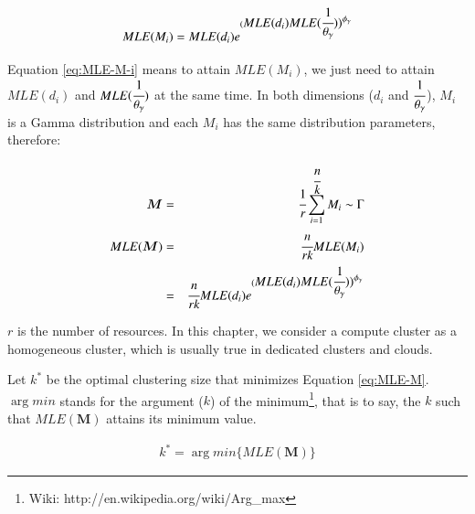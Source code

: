 \begin{equation} 
\label{eq:MLE-M-i}
MLE(M_i)=MLE(d_i)e^{(\displaystyle MLE(d_i)MLE(\cfrac{1}{\theta_{\gamma}}))^{\phi_{\gamma}}} 
\end{equation}

Equation \ref{eq:MLE-M-i} means to attain $MLE(M_i)$, we just need to attain $MLE(d_i)$ and $MLE(\cfrac{1}{\theta_{\gamma}})$ at the same time. 
In both dimensions ($d_i$ and $\displaystyle\cfrac{1}{\theta_{\gamma}}$), $M_i$ is a Gamma distribution and each $M_i$ has the same distribution parameters, therefore:

\begin{eqnarray} 
\label{eq:MLE-M}
\bm{M}&=&\displaystyle\cfrac{1}{r}\sum_{i=1}^{\cfrac{n}{k}}M_i\sim\Gamma \nonumber\\
MLE(\bm{M})&=&\displaystyle\cfrac{n}{rk}MLE(M_i)\\
&=&\displaystyle\cfrac{n}{rk} MLE(d_i)e^{(\displaystyle MLE(d_i)MLE(\cfrac{1}{\theta_{\gamma}}))^{\phi_{\gamma}}} 
\end{eqnarray}

$r$ is the number of resources. In this chapter, we consider a compute cluster as a homogeneous cluster, which is usually true in dedicated clusters and clouds. 




Let $k^*$ be the optimal clustering size that minimizes Equation \ref{eq:MLE-M}.  $\arg min$  stands for the argument ($k$) of the minimum\footnote{Wiki: http://en.wikipedia.org/wiki/Arg\_max}, that is to say, the $k$ such that $MLE(\bm{M})$ attains its minimum value. 

\begin{eqnarray} 
\label{eq:k_optimal}
k^*=\arg min\{MLE(\bm{M})\} 
\end{eqnarray}

